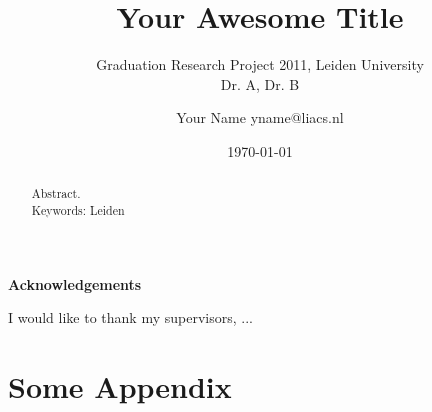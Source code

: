 \documentclass[11pt,a4paper,english]{scrartcl}
\makeatletter
\newcommand\ackname{Acknowledgements}
\newenvironment{acknowledgements}{%
      \titlepage
      \null\vfil
      \@beginparpenalty\@lowpenalty
      \begin{center}%
        \bfseries \ackname
        \@endparpenalty\@M
      \end{center}}%
     {\par\vfil\null\endtitlepage}
\newenvironment{acknowledgements}{%
      \if@twocolumn
        \section*{Acknowledgements}%
      \else
        \small
        \begin{center}%
          {\bfseries \ackname\vspace{-.5em}\vspace{\z@}}%
        \end{center}%
        \quotation
      \fi}
      {\if@twocolumn\else\endquotation\fi}
\makeatother
\begin{document}

\titlehead{Leiden Institute of Advanced Computer Science (LIACS), Media Technology}
\title{\Large{Your Awesome Title}}
\subtitle{\small{Graduation Research Project 2011, Leiden University\\Dr. A, Dr. B}}
\author{\small{Your Name yname@liacs.nl}}
\date{\small{\today}}
\maketitle

\begin{abstract}
Abstract.
\\[1cm]
Keywords: Leiden
\end{abstract} 

\begin{acknowledgements}
I would like to thank my supervisors, ...
\end{acknowledgements}



\clearpage
\appendix
\section{Some Appendix}\label{app:a}
\clearpage



\end{document}
